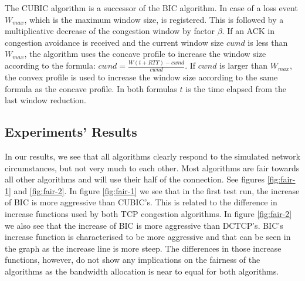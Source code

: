 \documentclass{article}
\begin{document}
The CUBIC algorithm is a successor of the BIC algorithm\cite{cubic-tcp-congestion}. In case of a loss event $W_{max}$, which is the maximum window size, is registered. This is followed by a multiplicative decrease of the congestion window by factor $\beta$. If an ACK in congestion avoidance is received and the current window size $cwnd$ is less than $W_{max}$, the algorithm uses the concave profile to increase the window size according to the formula: $cwnd = \frac{W(t+RTT)-cwnd}{cwnd}$. If $cwnd$ is larger than $W_{max}$, the convex profile is used to increase the window size according to the same formula as the concave profile. In both formulas $t$ is the time elapsed from the last window reduction.


\subsection{Experiments' Results}\label{sub:experiment-results}

In our results, we see that all algorithms clearly respond to the simulated
network circumstances, but not very much to each other. Most algorithms are
fair towards all other algorithms and will use their half of the connection.
See figures \ref{fig:fair-1} and \ref{fig:fair-2}. In figure \ref{fig:fair-1} we see that in the first test run, the increase of BIC is more aggressive than CUBIC's. This is related to the difference in increase functions used by both TCP congestion algorithms. In figure \ref{fig:fair-2} we also see that the increase of BIC is more aggressive than DCTCP's. BIC's increase function is characterised to be more aggressive and that can be seen in the graph as the increase line is more steep. The differences in those increase functions, however, do not show any implications on the fairness of the algorithms as the bandwidth allocation is near to equal for both algorithms. 
\end{document}
